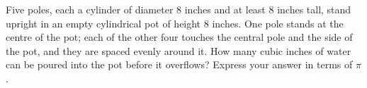 Five poles, each a cylinder of diameter $8$ inches and at least $8$ inches tall, stand upright in an empty cylindrical pot of height $8$ inches. One pole stands at the centre of the pot; each of the other four touches the central pole and the side of the pot, and they are spaced evenly around it. How many cubic inches of water can be poured into the pot before it overflows? Express your answer in terms of $\pi$.
